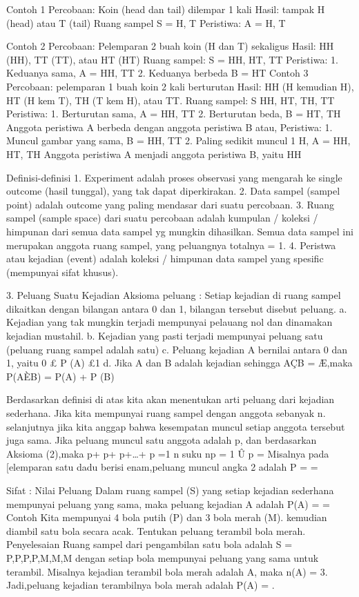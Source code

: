 \documentclass[11pt,fleqn]{book} %
\begin{document}
{ Contoh 1
Percobaan: Koin (head dan tail) dilempar 1 kali
Hasil: tampak H (head) atau T (tail)
Ruang sampel S = {H, T}
Peristiwa: A = {H, T}

Contoh 2
Percobaan: Pelemparan 2 buah koin (H dan T) sekaligus
Hasil: HH (HH), TT (TT), atau HT (HT)
Ruang sampel: S = {HH, HT, TT}
Peristiwa: 1. Keduanya sama, A = {HH, TT}
2. Keduanya berbeda B = {HT}
Contoh 3
Percobaan: pelemparan 1 buah koin 2 kali berturutan
Hasil: HH (H kemudian H), HT (H kem T), TH (T kem H), atau TT.
Ruang sampel: S {HH, HT, TH, TT}
Peristiwa: 1. Berturutan sama, A = {HH, TT}
2. Berturutan beda, B = {HT, TH}
Anggota peristiwa A berbeda dengan anggota peristiwa B atau,
Peristiwa: 1. Muncul gambar yang sama, B = {HH, TT}
2. Paling sedikit muncul 1 H, A = {HH, HT, TH}
Anggota peristiwa A menjadi anggota peristiwa B, yaitu HH

Definisi-definisi
1.      Experiment adalah proses observasi yang mengarah ke single outcome (hasil tunggal), yang tak dapat diperkirakan.
2.      Data sampel (sampel point) adalah outcome yang paling mendasar dari suatu percobaan.
3.      Ruang sampel (sample space) dari suatu percobaan adalah kumpulan / koleksi / himpunan dari semua data sampel yg mungkin dihasilkan. Semua data sampel ini merupakan anggota ruang sampel, yang peluangnya totalnya = 1.
4.      Peristwa atau kejadian (event) adalah koleksi / himpunan data sampel yang spesific (mempunyai sifat khusus).

3.      Peluang Suatu Kejadian
Aksioma peluang :
Setiap kejadian di ruang sampel dikaitkan dengan bilangan antara 0 dan 1, bilangan tersebut disebut peluang.
a.       Kejadian yang tak mungkin terjadi mempunyai pelauang nol dan dinamakan kejadian mustahil.
b.      Kejadian yang pasti terjadi mempunyai peluang satu (peluang ruang sampel adalah satu)
c.       Peluang kejadian A bernilai antara 0 dan 1, yaitu 0 £ P (A) £1
d.      Jika A dan B adalah kejadian sehingga AÇB = Æ,maka P(AÈB) = P(A) + P (B)

Berdasarkan definisi di atas kita akan menentukan arti peluang dari kejadian sederhana. Jika kita mempunyai ruang sampel dengan anggota sebanyak n. selanjutnya jika kita anggap bahwa kesempatan muncul setiap anggota tersebut juga sama. Jika peluang muncul satu anggota adalah p, dan berdasarkan Aksioma (2),maka
p+ p+ p+…+ p =1
n suku
np = 1 Û p =
Misalnya pada [elemparan satu dadu berisi enam,peluang muncul angka 2 adalah
P =  =

Sifat : Nilai Peluang
Dalam ruang sampel (S) yang setiap kejadian sederhana mempunyai peluang yang sama, maka peluang kejadian A adalah
P(A) =  =
Contoh
Kita mempunyai 4 bola putih (P) dan 3 bola merah (M). kemudian diambil satu bola secara acak. Tentukan peluang terambil bola merah.
Penyelesaian
Ruang sampel dari pengambilan satu bola adalah S = {P,P,P,P,M,M,M} dengan setiap bola mempunyai peluang yang sama untuk terambil. Misalnya kejadian terambil bola merah adalah A, maka n(A) = 3. Jadi,peluang kejadian terambilnya bola merah adalah P(A) = .

}
\end{document}
